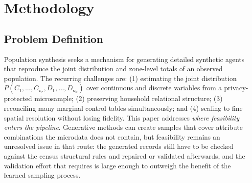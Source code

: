 \documentclass[review]{elsarticle}
\begin{document}
\begin{frontmatter}
\end{frontmatter}



\section{Methodology}
\label{sec:methodology}

\subsection{Problem Definition}
Population synthesis seeks a mechanism for generating detailed synthetic agents that reproduce the joint distribution and zone-level totals of an observed population. The recurring challenges are: (1) estimating the joint distribution $P(C_1,\dots,C_{n_c},D_1,\dots,D_{n_d})$ over continuous and discrete variables from a privacy-protected microsample; (2) preserving household relational structure; (3) reconciling many marginal control tables simultaneously; and (4) scaling to fine spatial resolution without losing fidelity. This paper addresses \emph{where feasibility enters the pipeline}. Generative methods can create samples that cover attribute combinations the microdata does not contain, but feasibility remains an unresolved issue in that route: the generated records still have to be checked against the census structural rules and repaired or validated afterwards, and the validation effort that requires is large enough to outweigh the benefit of the learned sampling process.

\end{document}
